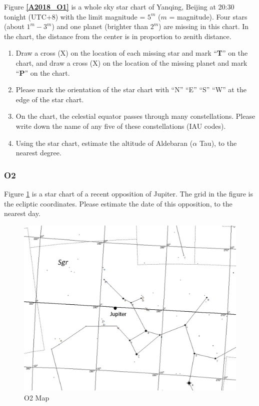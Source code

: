 \documentclass[a4paper,12pt]{extarticle}
\begin{document}
Figure \textbf{\ref{A2018_O1}} is a whole sky star chart of Yanqing, Beijing at 20:30 tonight (UTC+8) with the limit magnitude = $5^m$ ($m$ = magnitude). Four stars (about $1^m - 3^m$) and one planet (brighter than $2^m$) are missing in this chart. In the chart, the distance from the center is in proportion to zenith distance.

\begin{enumerate}
    \item Draw a cross (X) on the location of each missing star and mark “\textbf{T}” on the chart, and draw a cross (X) on the location of the missing planet and mark “\textbf{P}” on the chart.
    \item Please mark the orientation of the star chart with “N” “E” “S” “W” at the edge of the star chart.
    \item On the chart, the celestial equator passes through many constellations. Please write down the name of any five of these constellations (IAU codes).
    \item Using the star chart, estimate the altitude of Aldebaran ($\alpha$ Tau), to the nearest degree. 
\end{enumerate}

\subsubsection{O2}

Figure \ref{A2018_O2} is a star chart of a recent opposition of Jupiter. The grid in the figure is the ecliptic coordinates. Please estimate the date of this opposition, to the nearest day.

\begin{figure}[H]
    \centering
    \includegraphics[width=0.95\linewidth]{18_O2.png}
    \caption{O2 Map}
    \label{A2018_O2}
\end{figure}
\end{document}
